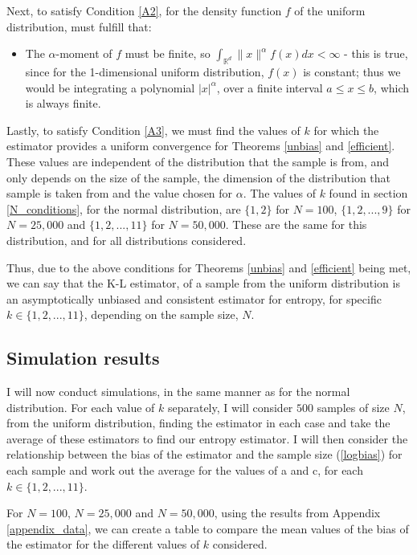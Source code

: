 \documentclass[12pt]{report}
\begin{document}
Next, to satisfy Condition \ref{A2}, for the density function $f$ of the uniform distribution, must fulfill that:
\begin{itemize}
\item The $\alpha$-moment of $f$ must be finite, so $\int_{\mathbb{R}^{d}} \| x \|^{\alpha} f(x) dx < \infty$ - this is true, since for the 1-dimensional uniform distribution, $f(x)$ is constant; thus we would be integrating a polynomial $|x|^{\alpha}$, over a finite interval $a \leq x \leq b$, which is always finite.
\end{itemize}

Lastly, to satisfy Condition \ref{A3}, we must find the values of $k$ for which the estimator provides a uniform convergence for Theorems \ref{unbias} and \ref{efficient}. These values are independent of the distribution that the sample is from, and only depends on the size of the sample, the dimension of the distribution that sample is taken from and the value chosen for $\alpha$. The values of $k$ found in section \ref{N_conditions}, for the normal distribution, are $\{1,2\}$ for $N=100$, $\{1, 2, ..., 9\}$ for $N=25,000$ and $\{1, 2, ..., 11\}$ for $N=50,000$. These are the same for this distribution, and for all distributions considered.

Thus, due to the above conditions for Theorems \ref{unbias} and \ref{efficient} being met, we can say that the K-L estimator, of a sample from the uniform distribution is an asymptotically unbiased and consistent estimator for entropy, for specific $k \in \{1, 2, ..., 11 \}$, depending on the sample size, $N$.




\subsection{Simulation results} \label{Uniform_results}

I will now conduct simulations, in the same manner as for the normal distribution. For each value of $k$ separately, I will consider $500$ samples of size $N$, from the uniform distribution, finding the estimator in each case and take the average of these estimators to find our entropy estimator. I will then consider the relationship between the bias of the estimator and the sample size (\ref{logbias}) for each sample and work out the average for the values of a and c, for each $k \in \{1, 2, ..., 11\}$. 

For $N=100$, $N=25,000$ and $N=50,000$, using the results from Appendix \ref{appendix_data}, we can create a table to compare the mean values of the bias of the estimator for the different values of $k$ considered. 
\end{document}
